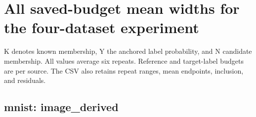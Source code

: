 \endgroup

\reservetable
\section{All saved-budget mean widths for the four-dataset experiment}

K denotes known membership, Y the anchored label probability, and N candidate membership. All values average six repeats. Reference and target-label budgets are per source. The CSV also retains repeat ranges, mean endpoints, inclusion, and residuals.

\reservetable
\subsection{mnist: image\_derived}

